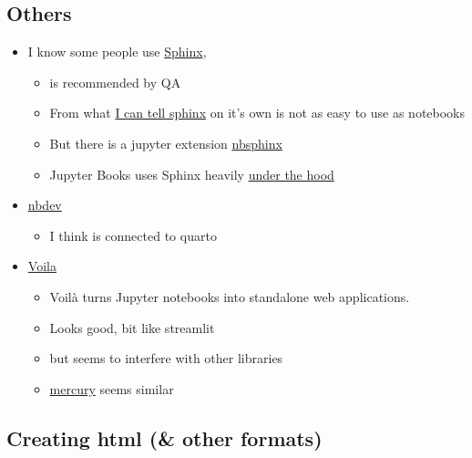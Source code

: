 \documentclass[
  letterpaper,
  DIV=11,
  numbers=noendperiod]{scrartcl}
\providecommand{\tightlist}{%
  \setlength{\itemsep}{0pt}\setlength{\parskip}{0pt}}\usepackage{longtable,booktabs,array}
\begin{document}
\hypertarget{others}{%
\subsection{Others}\label{others}}

\begin{itemize}
\tightlist
\item
  I know some people use
  \href{https://www.sphinx-doc.org/en/master/}{Sphinx},

  \begin{itemize}
  \tightlist
  \item
    is recommended by QA
  \item
    From what
    \href{https://www.sphinx-doc.org/en/master/tutorial/index.html}{I
    can tell sphinx} on it's own is not as easy to use as notebooks
  \item
    But there is a jupyter extension
    \href{https://nbsphinx.readthedocs.io/en/0.8.10/}{nbsphinx}
  \item
    Jupyter Books uses Sphinx heavily
    \href{https://jupyterbook.org/en/stable/explain/sphinx.html}{under
    the hood}
  \end{itemize}
\item
  \href{https://nbdev.fast.ai/getting_started.html}{nbdev}

  \begin{itemize}
  \tightlist
  \item
    I think is connected to quarto
  \end{itemize}
\item
  \href{https://github.com/voila-dashboards/voila}{Voila}

  \begin{itemize}
  \tightlist
  \item
    Voilà turns Jupyter notebooks into standalone web applications.
  \item
    Looks good, bit like streamlit
  \item
    but seems to interfere with other libraries
  \item
    \href{https://github.com/mljar/mercury}{mercury} seems similar
  \end{itemize}
\end{itemize}

\hypertarget{creating-html-other-formats}{%
\subsection{Creating html (\& other
formats)}\label{creating-html-other-formats}}
\end{document}
